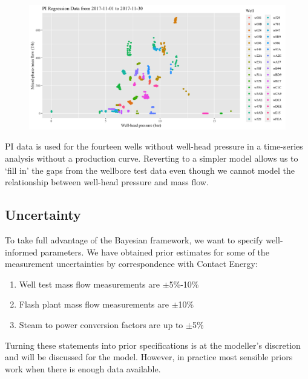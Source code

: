 \documentclass[a4paper, 12pt]{article}
\begin{document}
\begin{figure}
  \centering
  \includegraphics[width=\linewidth]{media/pi_data}
  \label{fig:pi_data}
\end{figure}

PI data is used for the fourteen wells without well-head pressure in a time-series analysis without a production curve. Reverting to a simpler model allows us to `fill in' the gaps from the wellbore test data even though we cannot model the relationship between well-head pressure and mass flow.

\subsection{Uncertainty}
To take full advantage of the Bayesian framework, we want to specify well-informed parameters. We have obtained prior estimates for some of the measurement uncertainties by correspondence with Contact Energy:

\begin{enumerate}
\item Well test mass flow measurements are $\pm$5\%-10\%
\item Flash plant mass flow measurements are $\pm$10\%
\item Steam to power conversion factors are up to $\pm$5\%
\end{enumerate}

Turning these statements into prior specifications is at the modeller's discretion and will be discussed for the model. However, in practice most sensible priors work when there is enough data available.
\end{document}
